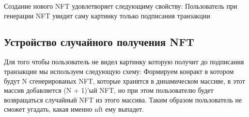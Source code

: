 \begin{remark}
	Создание нового NFT удовлетворяет следующиму свойству: Пользователь при генерации NFT увидит саму картинку только подписания транзакции
\end{remark}

\subsection{Устройство случайного получения NFT}
 Для того чтобы пользователь не видел картинку которую получит до подписания транзакции мы используем следующую схему:
  Формируем конракт в котором будут N сгенерированых NFT, которые хранятся в динамическом массиве, в этот массив добавляется (N + 1)'ый NFT, но при этом пользователю будет возвращаться случайный NFT из этого массива.
  Таким образом пользователь не сможет угадать, какая именно nft ему выпадет.

